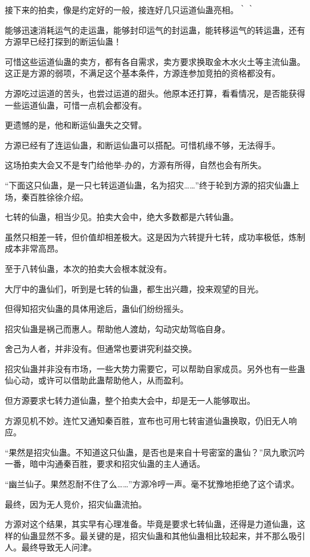 
\begin{this_body}

接下来的拍卖，像是约定好的一般，接连好几只运道仙蛊亮相。｀｀

能够迅速消耗运气的走运蛊，能够封印运气的封运蛊，能转移运气的转运蛊，还有方源早已经打探到的断运仙蛊！

可惜这些运道仙蛊的卖方，都有各自需求，卖方要求换取金木水火土等主流仙蛊。这正是方源的弱项，不满足这个基本条件，方源连参加竞拍的资格都没有。

方源吃过运道的苦头，也尝过运道的甜头。他原本还打算，看看情况，是否能获得一些运道仙蛊，可惜一点机会都没有。

更遗憾的是，他和断运仙蛊失之交臂。

方源已经有了连运仙蛊，和断运仙蛊可以搭配。可惜机缘不够，无法得手。

这场拍卖大会又不是专门给他举-办的，方源有所得，自然也会有所失。

“下面这只仙蛊，是一只七转运道仙蛊，名为招灾……”终于轮到方源的招灾仙蛊上场，秦百胜徐徐介绍。

七转的仙蛊，相当少见。拍卖大会中，绝大多数都是六转仙蛊。

虽然只相差一转，但价值却相差极大。这是因为六转提升七转，成功率极低，炼制成本非常高昂。

至于八转仙蛊，本次的拍卖大会根本就没有。

大厅中的蛊仙们，听到是七转的仙蛊，都生出兴趣，投来观望的目光。

但得知招灾仙蛊的具体用途后，蛊仙们纷纷摇头。

招灾仙蛊是祸己而惠人。帮助他人渡劫，勾动灾劫驾临自身。

舍己为人者，并非没有。但通常也要讲究利益交换。

招灾仙蛊并非没有市场，一些大势力需要它，可以帮助自家成员。另外也有一些蛊仙心动，或许可以借助此蛊帮助他人，从而盈利。

但方源要求七转力道仙蛊，整个拍卖大会中，却是无一人能够取出。

方源见机不妙。连忙又通知秦百胜，宣布也可用七转宙道仙蛊换取，仍旧无人响应。

“果然是招灾仙蛊。不知道这只仙蛊，是否也是来自十号密室的蛊仙？”凤九歌沉吟一番，暗中沟通秦百胜，要求和招灾仙蛊的主人通话。

“幽兰仙子。果然忍耐不住了么……”方源冷哼一声。毫不犹豫地拒绝了这个请求。

最终，因为无人竞价，招灾仙蛊流拍。

方源对这个结果，其实早有心理准备。毕竟是要求七转仙蛊，还得是力道仙蛊，这样的仙蛊显然不多。最关键的是，招灾仙蛊和其他仙蛊相比较起来，并不那么吸引人。最终导致无人问津。


\end{this_body}
